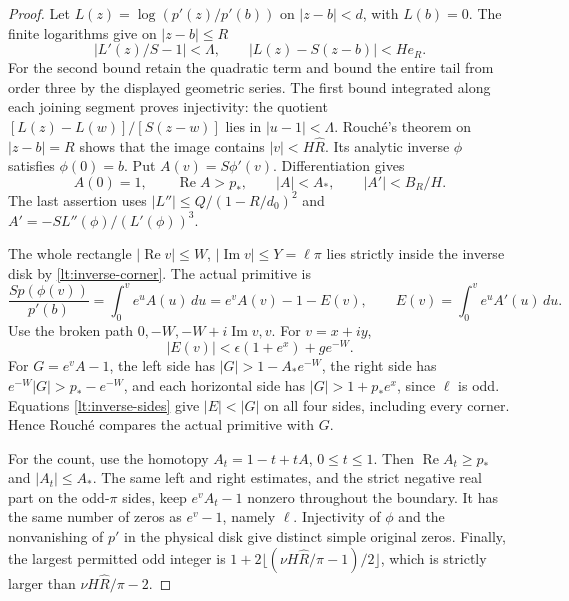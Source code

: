 \documentclass[11pt,reqno]{amsart}
\numberwithin{equation}{section}
\theoremstyle{definition}
\theoremstyle{remark}
\renewcommand{\Re}{\operatorname{Re}}
\renewcommand{\Im}{\operatorname{Im}}
\begin{document}
\begin{proof}
Let $L(z)=\log(p'(z)/p'(b))$ on $|z-b|<d$, with $L(b)=0$.
The finite logarithms give on $|z-b|\le R$
\[
 |L'(z)/S-1|<\Lambda,\qquad
 |L(z)-S(z-b)|<He_R.
\]
For the second bound retain the quadratic term and bound the entire
tail from order three by the displayed geometric series. The first
bound integrated along each joining segment proves injectivity: the
quotient $[L(z)-L(w)]/[S(z-w)]$ lies in $|u-1|<\Lambda$.
Rouch\'e's theorem on $|z-b|=R$ shows that the image contains
$|v|<H\widehat R$. Its analytic inverse $\phi$ satisfies
$\phi(0)=b$. Put $A(v)=S\phi'(v)$. Differentiation gives
\[
 A(0)=1,\qquad \Re A>p_*,\qquad |A|<A_*,\qquad |A'|<B_R/H.
\]
The last assertion uses
$|L''|\le Q/(1-R/d_0)^2$ and
$A'=-S L''(\phi)/(L'(\phi))^3$.

The whole rectangle $|\Re v|\le W$, $|\Im v|\le Y=\ell\pi$
lies strictly inside the inverse disk by \eqref{lt:inverse-corner}.
The actual primitive is
\[
 \frac{Sp(\phi(v))}{p'(b)}
  =\int_0^ve^uA(u)\,du=e^vA(v)-1-E(v),\qquad
 E(v)=\int_0^ve^uA'(u)\,du.
\]
Use the broken path $0,-W,-W+i\Im v,v$. For $v=x+iy$,
\[
 |E(v)|<\epsilon(1+e^x)+ge^{-W}.
\]
For $G=e^vA-1$, the left side has $|G|>1-A_*e^{-W}$,
the right side has $e^{-W}|G|>p_*-e^{-W}$, and each horizontal
side has $|G|>1+p_*e^x$, since $\ell$ is odd. Equations
\eqref{lt:inverse-sides} give $|E|<|G|$ on all four sides,
including every corner. Hence Rouch\'e compares the actual
primitive with $G$.

For the count, use the homotopy $A_t=1-t+tA$,
$0\le t\le1$. Then $\Re A_t\ge p_*$ and $|A_t|\le A_*$.
The same left and right estimates, and the strict negative real part
on the odd-$\pi$ sides, keep $e^vA_t-1$ nonzero throughout the
boundary. It has the same number of zeros as $e^v-1$, namely
$\ell$. Injectivity of $\phi$ and the nonvanishing of $p'$ in
the physical disk give distinct simple original zeros.
Finally, the largest permitted odd integer is
$1+2\lfloor(\nu H\widehat R/\pi-1)/2\rfloor$, which is
strictly larger than $\nu H\widehat R/\pi-2$.
\end{proof}
\end{document}
